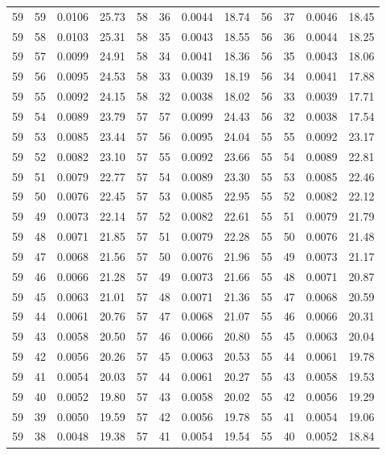 \begin{tabular}{llll|llll|llll}
59 & 59 & 0.0106 & 25.73 & 58 & 36 & 0.0044 & 18.74 & 56 & 37 & 0.0046 & 18.45\\
59 & 58 & 0.0103 & 25.31 & 58 & 35 & 0.0043 & 18.55 & 56 & 36 & 0.0044 & 18.25\\
59 & 57 & 0.0099 & 24.91 & 58 & 34 & 0.0041 & 18.36 & 56 & 35 & 0.0043 & 18.06\\
59 & 56 & 0.0095 & 24.53 & 58 & 33 & 0.0039 & 18.19 & 56 & 34 & 0.0041 & 17.88\\
59 & 55 & 0.0092 & 24.15 & 58 & 32 & 0.0038 & 18.02 & 56 & 33 & 0.0039 & 17.71\\
59 & 54 & 0.0089 & 23.79 & 57 & 57 & 0.0099 & 24.43 & 56 & 32 & 0.0038 & 17.54\\
59 & 53 & 0.0085 & 23.44 & 57 & 56 & 0.0095 & 24.04 & 55 & 55 & 0.0092 & 23.17\\
59 & 52 & 0.0082 & 23.10 & 57 & 55 & 0.0092 & 23.66 & 55 & 54 & 0.0089 & 22.81\\
59 & 51 & 0.0079 & 22.77 & 57 & 54 & 0.0089 & 23.30 & 55 & 53 & 0.0085 & 22.46\\
59 & 50 & 0.0076 & 22.45 & 57 & 53 & 0.0085 & 22.95 & 55 & 52 & 0.0082 & 22.12\\
59 & 49 & 0.0073 & 22.14 & 57 & 52 & 0.0082 & 22.61 & 55 & 51 & 0.0079 & 21.79\\
59 & 48 & 0.0071 & 21.85 & 57 & 51 & 0.0079 & 22.28 & 55 & 50 & 0.0076 & 21.48\\
59 & 47 & 0.0068 & 21.56 & 57 & 50 & 0.0076 & 21.96 & 55 & 49 & 0.0073 & 21.17\\
59 & 46 & 0.0066 & 21.28 & 57 & 49 & 0.0073 & 21.66 & 55 & 48 & 0.0071 & 20.87\\
59 & 45 & 0.0063 & 21.01 & 57 & 48 & 0.0071 & 21.36 & 55 & 47 & 0.0068 & 20.59\\
59 & 44 & 0.0061 & 20.76 & 57 & 47 & 0.0068 & 21.07 & 55 & 46 & 0.0066 & 20.31\\
59 & 43 & 0.0058 & 20.50 & 57 & 46 & 0.0066 & 20.80 & 55 & 45 & 0.0063 & 20.04\\
59 & 42 & 0.0056 & 20.26 & 57 & 45 & 0.0063 & 20.53 & 55 & 44 & 0.0061 & 19.78\\
59 & 41 & 0.0054 & 20.03 & 57 & 44 & 0.0061 & 20.27 & 55 & 43 & 0.0058 & 19.53\\
59 & 40 & 0.0052 & 19.80 & 57 & 43 & 0.0058 & 20.02 & 55 & 42 & 0.0056 & 19.29\\
59 & 39 & 0.0050 & 19.59 & 57 & 42 & 0.0056 & 19.78 & 55 & 41 & 0.0054 & 19.06\\
59 & 38 & 0.0048 & 19.38 & 57 & 41 & 0.0054 & 19.54 & 55 & 40 & 0.0052 & 18.84\\

\end{tabular}

